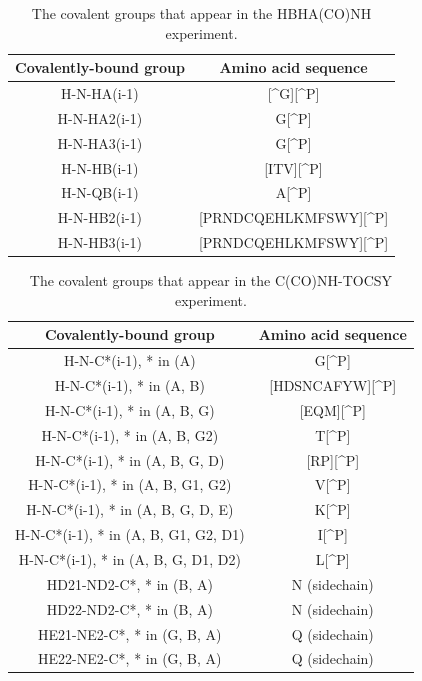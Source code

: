 \begin{table}
  \begin{tabular}{ | c | c | }
    \hline
    Covalently-bound group       &  Amino acid sequence         \\  \hline
    H-N-HA(i-1)                  &  [\^{}G][\^{}P]              \\  \hline
    H-N-HA2(i-1)                 &  G[\^{}P]                    \\  \hline
    H-N-HA3(i-1)                 &  G[\^{}P]                    \\  \hline
    H-N-HB(i-1)                  &  [ITV][\^{}P]                \\  \hline
    H-N-QB(i-1)                  &  A[\^{}P]                    \\  \hline
    H-N-HB2(i-1)                 &  [PRNDCQEHLKMFSWY][\^{}P]    \\  \hline
    H-N-HB3(i-1)                 &  [PRNDCQEHLKMFSWY][\^{}P]    \\  \hline
  \end{tabular}
  \caption{The covalent groups that appear in the HBHA(CO)NH experiment.}
  \label{hbhaconh_peaktypes}
\end{table}

\begin{table}
  \begin{tabular}{ | c | c | }
    \hline
    Covalently-bound group              &  Amino acid sequence  \\  \hline
    H-N-C*(i-1), * in (A)               &  G[\^{}P]             \\  \hline
    H-N-C*(i-1), * in (A, B)            &  [HDSNCAFYW][\^{}P]   \\  \hline
    H-N-C*(i-1), * in (A, B, G)         &  [EQM][\^{}P]         \\  \hline
    H-N-C*(i-1), * in (A, B, G2)        &  T[\^{}P]             \\  \hline
    H-N-C*(i-1), * in (A, B, G, D)      &  [RP][\^{}P]          \\  \hline
    H-N-C*(i-1), * in (A, B, G1, G2)    &  V[\^{}P]             \\  \hline
    H-N-C*(i-1), * in (A, B, G, D, E)   &  K[\^{}P]             \\  \hline
    H-N-C*(i-1), * in (A, B, G1, G2, D1)&  I[\^{}P]             \\  \hline
    H-N-C*(i-1), * in (A, B, G, D1, D2) &  L[\^{}P]             \\  \hline
    HD21-ND2-C*, * in (B, A)            &  N (sidechain)            \\  \hline
    HD22-ND2-C*, * in (B, A)            &  N (sidechain)            \\  \hline
    HE21-NE2-C*, * in (G, B, A)         &  Q (sidechain)            \\  \hline
    HE22-NE2-C*, * in (G, B, A)         &  Q (sidechain)            \\  \hline
  \end{tabular}
  \caption{The covalent groups that appear in the C(CO)NH-TOCSY experiment.}
  \label{cconh_peaktypes}
\end{table}

